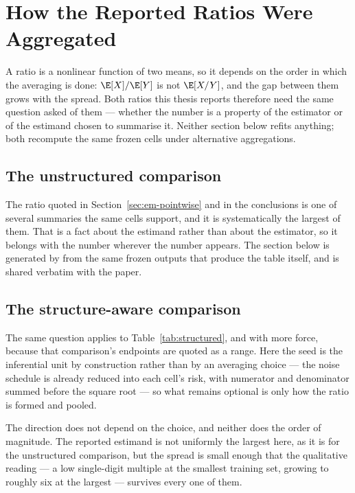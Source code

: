 \chapter{How the Reported Ratios Were Aggregated}\label{app:aggregation-chapter}

A ratio is a nonlinear function of two means, so it depends on the order in
which the averaging is done: $\E[X]/\E[Y]$ is not $\E[X/Y]$, and the gap
between them grows with the spread. Both ratios this thesis reports therefore
need the same question asked of them --- whether the number is a property of
the estimator or of the estimand chosen to summarise it. Neither section
below refits anything; both recompute the same frozen cells under alternative
aggregations.

\section{The unstructured comparison}

The ratio quoted in Section~\ref{sec:em-pointwise} and in the conclusions is one
of several summaries the same cells support, and it is systematically the
largest of them. That is a fact about the estimand rather than about the
estimator, so it belongs with the number wherever the number appears. The
section below is generated by
 from the same frozen outputs
that produce the table itself, and is shared verbatim with the paper.



\section{The structure-aware comparison}

The same question applies to Table~\ref{tab:structured}, and with more force,
because that comparison's endpoints are quoted as a range. Here the seed is the
inferential unit by construction rather than by an averaging choice --- the
noise schedule is already reduced into each cell's risk, with numerator and
denominator summed before the square root --- so what remains optional is only
how the ratio is formed and pooled.



\noindent The direction does not depend on the choice, and neither does the
order of magnitude. The reported estimand is not uniformly the largest here, as
it is for the unstructured comparison, but the spread is small enough that the
qualitative reading --- a low single-digit multiple at the smallest training set,
growing to roughly six at the largest --- survives every one of them.
